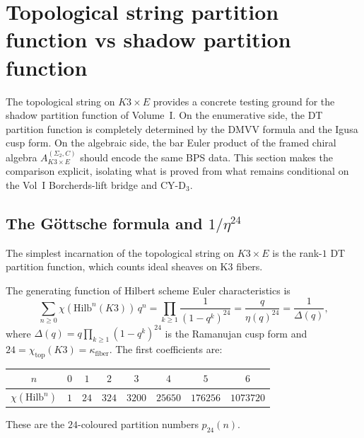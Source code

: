 

\section{Topological string partition function vs shadow partition function}
\label{sec:k3e-topological-string-shadow}

The topological string on $K3 \times E$ provides a concrete testing ground for the shadow partition function of Volume~I. On the enumerative side, the DT partition function is completely determined by the DMVV formula and the Igusa cusp form. On the algebraic side, the bar Euler product of the framed chiral algebra $A_{K3 \times E}^{(\Sigma_2,C)}$ should encode the same BPS data. This section makes the comparison explicit, isolating what is proved from what remains conditional on the Vol~I Borcherds-lift bridge and CY-D$_3$.

\subsection{The G\"ottsche formula and \texorpdfstring{$1/\eta^{24}$}{1/eta-24}}
\label{subsec:k3e-gottsche-eta}

The simplest incarnation of the topological string on $K3 \times E$ is the rank-$1$ DT partition function, which counts ideal sheaves on K3 fibers.

\begin{theorem}[G\"ottsche, 1990]
\label{thm:k3e-gottsche-product}
The generating function of Hilbert scheme Euler characteristics is
\[
 \sum_{n \geq 0} \chi(\mathrm{Hilb}^n(K3)) \, q^n
 = \prod_{k \geq 1} \frac{1}{(1 - q^k)^{24}}
 = \frac{q}{\eta(q)^{24}}
 = \frac{1}{\Delta(q)},
\]
where $\Delta(q) = q \prod_{k \geq 1}(1 - q^k)^{24}$ is the Ramanujan cusp form and $24 = \chi_{\mathrm{top}}(K3) = \kappa_{\mathrm{fiber}}$. The first coefficients are:
\begin{center}
\begin{tabular}{c|ccccccc}
$n$ & $0$ & $1$ & $2$ & $3$ & $4$ & $5$ & $6$ \\ \hline
$\chi(\mathrm{Hilb}^n)$ & $1$ & $24$ & $324$ & $3200$ & $25650$ & $176256$ & $1073720$
\end{tabular}
\end{center}
These are the $24$-coloured partition numbers $p_{24}(n)$.
\end{theorem}

